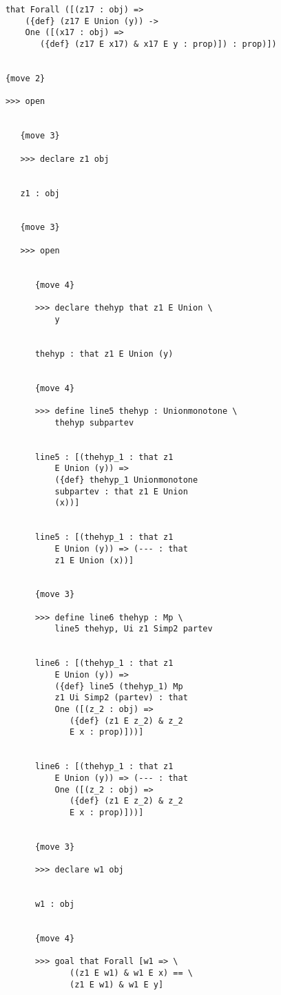 \documentclass[12pt]{article}
\begin{document}
\begin{verbatim}
      that Forall ([(z17 : obj) => 
          ({def} (z17 E Union (y)) -> 
          One ([(x17 : obj) => 
             ({def} (z17 E x17) & x17 E y : prop)]) : prop)])


      {move 2}

      >>> open


         {move 3}

         >>> declare z1 obj


         z1 : obj


         {move 3}

         >>> open


            {move 4}

            >>> declare thehyp that z1 E Union \
                y


            thehyp : that z1 E Union (y)


            {move 4}

            >>> define line5 thehyp : Unionmonotone \
                thehyp subpartev


            line5 : [(thehyp_1 : that z1 
                E Union (y)) => 
                ({def} thehyp_1 Unionmonotone 
                subpartev : that z1 E Union 
                (x))]


            line5 : [(thehyp_1 : that z1 
                E Union (y)) => (--- : that 
                z1 E Union (x))]


            {move 3}

            >>> define line6 thehyp : Mp \
                line5 thehyp, Ui z1 Simp2 partev


            line6 : [(thehyp_1 : that z1 
                E Union (y)) => 
                ({def} line5 (thehyp_1) Mp 
                z1 Ui Simp2 (partev) : that 
                One ([(z_2 : obj) => 
                   ({def} (z1 E z_2) & z_2 
                   E x : prop)]))]


            line6 : [(thehyp_1 : that z1 
                E Union (y)) => (--- : that 
                One ([(z_2 : obj) => 
                   ({def} (z1 E z_2) & z_2 
                   E x : prop)]))]


            {move 3}

            >>> declare w1 obj


            w1 : obj


            {move 4}

            >>> goal that Forall [w1 => \
                   ((z1 E w1) & w1 E x) == \
                   (z1 E w1) & w1 E y]



\end{verbatim}
\end{document}
